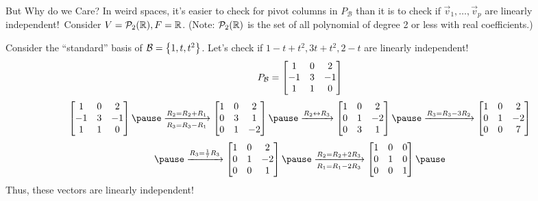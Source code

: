 \documentclass[xcoler=dvipsnames, aspectratio=169]{beamer}
\newcommand{\B}{\mathcal{B}}
\begin{document}
    \begin{frame}{But Why do we Care?}
        \footnotesize
        In weird spaces, it's easier to check for pivot columns in $P_\B$ than it is to check if
        $\vec{v}_1,\dots,\vec{v}_p$ are linearly independent!\pause\
        Consider $V=\mathcal{P}_2(\mathbb{R}),F=\mathbb{R}$. (Note: $\mathcal{P}_2(\mathbb{R})$ is the set of all polynomial of degree 2 or less
        with real coefficients.)\pause\

        Consider the ``standard'' basis of $\B=\setBasic{1,t,t^2}$. Let's check if 
        $1-t+t^2, 3t+t^2, 2-t$ are linearly independent!\pause\
        \[
            P_\B = \bMat{
                1 & 0 & 2\\
                -1& 3 &-1\\
                1 & 1 & 0
            }
        \]\pause
        \vspace{-5pt}
        \[
            \bMat{
                1 & 0 & 2\\
                -1& 3 &-1\\
                1 & 1 & 0
            }\pause\xrightarrow[R_3=R_3-R_1]{R_2=R_2+R_1}\bMat{
                1 & 0 & 2\\
                0 & 3 & 1\\
                0 & 1 &-2
            }\pause\xrightarrow{R_2\leftrightarrow R_3}\bMat{
                1 & 0 & 2\\
                0 & 1 &-2\\
                0 & 3 & 1
            }\pause\xrightarrow{R_3=R_3-3R_2}\bMat{
                1 & 0 & 2\\
                0 & 1 &-2\\
                0 & 0 & 7
            }
        \]
        \vspace{-5pt}
        \[
            \pause\xrightarrow{R_3=\frac{1}{7}R_3}\bMat{
                1 & 0 & 2\\
                0 & 1 &-2\\
                0 & 0 & 1
            }\pause\xrightarrow[R_1=R_1-2R_3]{R_2=R_2+2R_3}\bMat{
                1 & 0 & 0\\
                0 & 1 & 0\\
                0 & 0 & 1
            }\pause
        \]
        Thus, these vectors are linearly independent!
    \end{frame}
\end{document}
